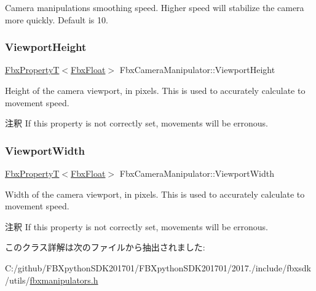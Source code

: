Camera manipulations smoothing speed. Higher speed will stabilize the camera more quickly. Default is 10. \mbox{\label{class_fbx_camera_manipulator_afdf345d7e5f01d42da8011bbeb8dc394}} 
\subsubsection{\texorpdfstring{Viewport\+Height}{ViewportHeight}}
{\footnotesize\ttfamily \hyperlink{class_fbx_property_t}{Fbx\+PropertyT}$<$\hyperlink{fbxtypes_8h_aef968e37f2ddc4188de464d8578c1d5c}{Fbx\+Float}$>$ Fbx\+Camera\+Manipulator\+::\+Viewport\+Height}

Height of the camera viewport, in pixels. This is used to accurately calculate to movement speed. \begin{DoxyRemark}{注釈}
If this property is not correctly set, movements will be erronous. 
\end{DoxyRemark}
\mbox{\label{class_fbx_camera_manipulator_a03e2795ba49c8bcce02dc786356ab2d5}} 
\subsubsection{\texorpdfstring{Viewport\+Width}{ViewportWidth}}
{\footnotesize\ttfamily \hyperlink{class_fbx_property_t}{Fbx\+PropertyT}$<$\hyperlink{fbxtypes_8h_aef968e37f2ddc4188de464d8578c1d5c}{Fbx\+Float}$>$ Fbx\+Camera\+Manipulator\+::\+Viewport\+Width}

Width of the camera viewport, in pixels. This is used to accurately calculate to movement speed. \begin{DoxyRemark}{注釈}
If this property is not correctly set, movements will be erronous. 
\end{DoxyRemark}


このクラス詳解は次のファイルから抽出されました\+:\begin{DoxyCompactItemize}
\item 
C\+:/github/\+F\+B\+Xpython\+S\+D\+K201701/\+F\+B\+Xpython\+S\+D\+K201701/2017./include/fbxsdk/utils/\hyperlink{fbxmanipulators_8h}{fbxmanipulators.\+h}\end{DoxyCompactItemize}
